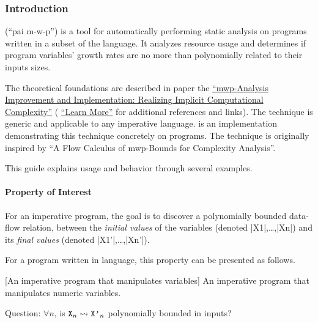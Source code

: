 \subsubsection{Introduction}
\label{guide-introduction}

 (\enquote{pai m-w-p}) is a tool for automatically performing static
analysis on programs written in a subset of the  language. It analyzes
resource usage and determines if program variables' growth rates are no more
than polynomially related to their inputs sizes.

The theoretical foundations are described in paper the
\hyperref[sec:fscd]{\enquote{mwp-Analysis Improvement and Implementation:
Realizing Implicit Computational Complexity}} (\cf
\hyperref[guide-learn-more]{\enquote{Learn More}} for additional references and
links). The technique is generic and applicable to any imperative
language.  is an implementation
demonstrating this technique concretely on  programs. The technique is
originally inspired by \enquote{A Flow Calculus of mwp-Bounds for Complexity
Analysis}.

This guide explains  usage and behavior through several examples.

\paragraph*{Property of Interest}

For an imperative program, the goal is to discover a polynomially bounded
data-flow relation, between the \emph{initial values}
of the variables (denoted \pr|X1|,\ldots{},\pr|Xn|) and its \emph{final values}
(denoted \pr|X1'|,\ldots{},\pr|Xn'|).

For a program written in  language, this property can be presented as
follows.

\begin{center}
\begin{minipage}{\textwidth}
\captionsetup{type=lstlisting}
[An imperative program that manipulates variables]
{An imperative program that manipulates numeric variables.}
\label{lst:guide}
\end{minipage}
\end{center}

Question: \(\forall n\), is \(\prm{X}_n \rightsquigarrow \prm{X'}_n\) polynomially bounded in inputs?


